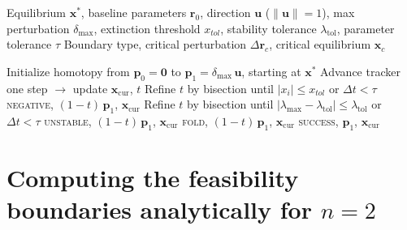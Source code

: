 \documentclass[pdflatex,sn-mathphys-num]{sn-jnl}%
\begin{document}
\begin{algorithm}[t]
\caption{Boundary detection via homotopy continuation}\label{alg:boundary}
\begin{algorithmic}[1]
\Require Equilibrium $\mathbf{x}^*$, baseline parameters $\mathbf{r}_0$, direction $\mathbf{u}$ ($\|\mathbf{u}\|=1$), max perturbation $\delta_{\max}$, extinction threshold $x_{tol}$, stability tolerance $\lambda_{\mathrm{tol}}$, parameter tolerance $\tau$
\Ensure Boundary type, critical perturbation $\Delta\mathbf{r}_c$, critical equilibrium $\mathbf{x}_c$

\State Initialize homotopy from $\mathbf{p}_0 = \mathbf{0}$ to $\mathbf{p}_1 = \delta_{\max}\,\mathbf{u}$, starting at $\mathbf{x}^*$
 \State Advance tracker one step $\to$ update $\mathbf{x}_{\mathrm{cur}}$, $t$
  
  \State Refine $t$ by bisection until $|x_i| \leq x_{tol}$ or $\Delta t < \tau$
  \State \Return \textsc{negative}, $(1-t)\,\mathbf{p}_1$, $\mathbf{x}_{\mathrm{cur}}$
 \EndIf
  
  \State Refine $t$ by bisection until $|\lambda_{\max} - \lambda_{\mathrm{tol}}| \leq \lambda_{\mathrm{tol}}$ or $\Delta t < \tau$
  \State \Return \textsc{unstable}, $(1-t)\,\mathbf{p}_1$, $\mathbf{x}_{\mathrm{cur}}$
 \EndIf
  \Return \textsc{fold}, $(1-t)\,\mathbf{p}_1$, $\mathbf{x}_{\mathrm{cur}}$ 
 \EndIf
\EndWhile
\State \Return \textsc{success}, $\mathbf{p}_1$, $\mathbf{x}_{\mathrm{cur}}$ 
\end{algorithmic}
\end{algorithm}

\section{Computing the feasibility boundaries analytically for $n = 2$}
\label{sec:si_analytical}
\end{document}
